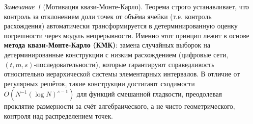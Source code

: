 \documentclass[12pt, a4paper]{article}
\theoremstyle{plain}
\theoremstyle{definition}
\theoremstyle{remark}
\newtheorem{remark}[theorem]{Замечание}
\begin{document}
\begin{remark}[Мотивация квази-Монте-Карло]
Теорема строго устанавливает, что контроль за отклонением доли точек от объёма ячейки (т.е. контроль расхождения) автоматически трансформируется в детерминированную оценку погрешности через модуль непрерывности. Именно этот принцип лежит в основе \textbf{метода квази-Монте-Карло (КМК)}: замена случайных выборок на детерминированные конструкции с низким расхождением (цифровые сети, $(t,m,s)$-последовательности), которые гарантируют справедливость относительно иерархической системы элементарных интервалов. В отличие от регулярных решёток, такие конструкции достигают сходимости $O(N^{-1}(\log N)^{s-1})$ для функций смешанной гладкости, преодолевая проклятие размерности за счёт алгебраического, а не чисто геометрического, контроля над распределением точек.
\end{remark}

\printbibliography[heading=bibintoc, title={Список литературы}]
\end{document}

